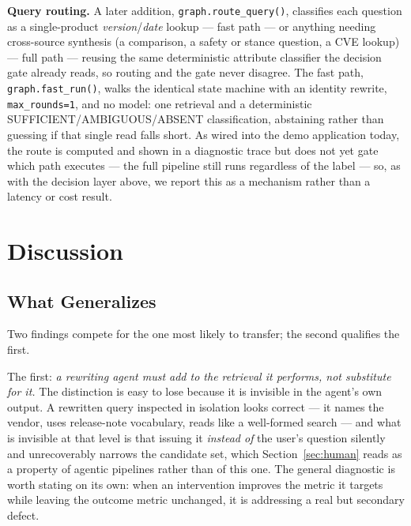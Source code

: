 \documentclass[10pt,conference]{IEEEtran}
\begin{document}
\textbf{Query routing.}\label{sec:routing}
A later addition, \texttt{graph.route\_query()}, classifies each question as a
single-product \emph{version}/\emph{date} lookup --- fast path --- or anything
needing cross-source synthesis (a comparison, a safety or stance question, a
CVE lookup) --- full path --- reusing the same deterministic attribute
classifier the decision gate already reads, so routing and the gate never
disagree. The fast path, \texttt{graph.fast\_run()}, walks the identical state
machine with an identity rewrite, \texttt{max\_rounds=1}, and no model: one
retrieval and a deterministic SUFFICIENT/AMBIGUOUS/ABSENT classification,
abstaining rather than guessing if that single read falls short. As wired into
the demo application today, the route is computed and shown in a diagnostic
trace but does not yet gate which path executes --- the full pipeline still
runs regardless of the label --- so, as with the decision layer above, we
report this as a mechanism rather than a latency or cost result.

\section{Discussion}\label{sec:discussion}

\subsection{What Generalizes}

Two findings compete for the one most likely to transfer; the second qualifies the
first.

The first: \emph{a rewriting agent must add to the retrieval it performs, not
substitute for it.} The distinction is easy to lose because it is invisible in the
agent's own output. A rewritten query inspected in isolation looks correct --- it
names the vendor, uses release-note vocabulary, reads like a well-formed search ---
and what is invisible at that level is that issuing it \emph{instead of} the user's
question silently and unrecoverably narrows the candidate set, which
Section~\ref{sec:human} reads as a property of agentic pipelines rather than of
this one. The general diagnostic is worth stating on its own: when an intervention
improves the metric it targets while leaving the outcome metric unchanged, it is
addressing a real but secondary defect.
\end{document}
